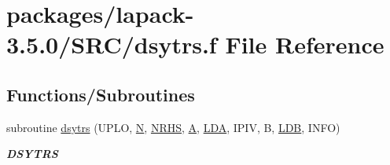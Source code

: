 \hypertarget{dsytrs_8f}{}\section{packages/lapack-\/3.5.0/\+S\+R\+C/dsytrs.f File Reference}
\label{dsytrs_8f}
\subsection*{Functions/\+Subroutines}
\begin{DoxyCompactItemize}
\item 
subroutine \hyperlink{group__doubleSYcomputational_ga6a223e61effac7232e98b422f147f032}{dsytrs} (U\+P\+L\+O, \hyperlink{polmisc_8c_a0240ac851181b84ac374872dc5434ee4}{N}, \hyperlink{example__user_8c_aa0138da002ce2a90360df2f521eb3198}{N\+R\+H\+S}, \hyperlink{classA}{A}, \hyperlink{example__user_8c_ae946da542ce0db94dced19b2ecefd1aa}{L\+D\+A}, I\+P\+I\+V, B, \hyperlink{example__user_8c_a50e90a7104df172b5a89a06c47fcca04}{L\+D\+B}, I\+N\+F\+O)
\begin{DoxyCompactList}\small\item\em {\bfseries D\+S\+Y\+T\+R\+S} \end{DoxyCompactList}\end{DoxyCompactItemize}
